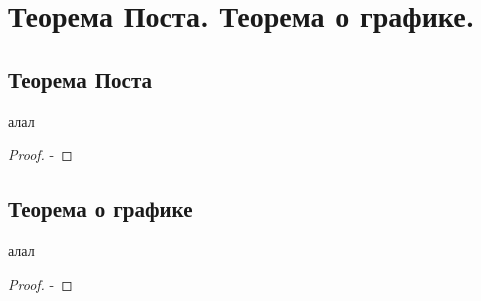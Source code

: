 \section{Теорема Поста. Теорема о графике.}

\subsection{Теорема Поста}

\begin{theorem}
  алал
  \begin{proof}
    -
  \end{proof}
\end{theorem}

\subsection{Теорема о графике}

\begin{theorem}
  алал
  \begin{proof}
    -
  \end{proof}
\end{theorem}